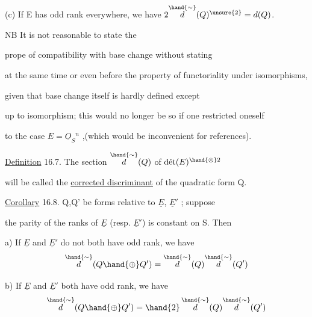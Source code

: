 
(c) If E has odd rank everywhere, we have $2\overset{\hand{\sim}}{d}(Q)^{\unsure{2}} = d(Q)$.


 \quad NB It is not reasonable to state the

prope of compatibility with base change without stating

at the same time\hand{,} or even before\hand{,} the property of functoriality under isomorphisms,

given that base change  itself is hardly defined except

up to isomorphism; this would no longer be so if one restricted oneself

to the case $E = \underline{O}_S{}^n$ ,(which would be inconvenient for references).

 \quad \uline{Definition} 16.7. The section $\overset{\hand{\sim}}{d}(Q)$ of $\text{dét}(E)^{\hand{\otimes}2}$

will be called the \uline{corrected discriminant} of the quadratic form Q.

\uline{Corollary} 16.8.  Q,Q' be forms relative to $\underline{E}$, $\underline{E}'$ ; suppose

the parity of the ranks of $\underline{E}$ (resp. $\underline{E}'$) is constant on S. Then

a) If $\underline{E}$ and $\underline{E}'$ do not both have odd rank, we have
\[ \overset{\hand{\sim}}{d}(Q \hand{\oplus} Q') = \overset{\hand{\sim}}{d}(Q)\overset{\hand{\sim}}{d}(Q') \]

b) If $\underline{E}$ and $\underline{E}'$ both have odd rank, we have
\[ \overset{\hand{\sim}}{d}(Q \hand{\oplus} Q') = \hand{2}\,\overset{\hand{\sim}}{d}(Q)\overset{\hand{\sim}}{d}(Q') \]

